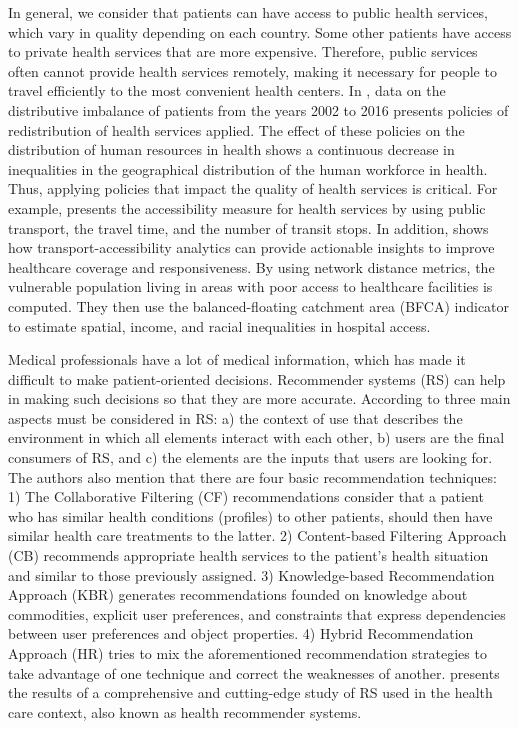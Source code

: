 \documentclass[sustainability,article,submit,pdftex,moreauthors]{Definitions/mdpi}
\begin{document}
In general, we consider that patients can have access to public health services, which vary in quality depending on each country. Some other patients have access to private health services that are more expensive. Therefore, public services often cannot provide health services remotely, making it necessary for people to travel efficiently to the most convenient health centers. In \citet{mollahaliloglu2021change}, data on the distributive imbalance of patients from the years 2002 to 2016 presents policies of redistribution of health services applied. The effect of these policies on the distribution of human resources in health shows a continuous decrease in inequalities in the geographical distribution of the human workforce in health. Thus, applying policies that impact the quality of health services is critical. For example, \citet{sharma2021public} presents the accessibility measure for health services by using public transport, the travel time, and the number of transit stops. In addition, \citet{PEREIRA2021113773} shows how transport-accessibility analytics can provide actionable insights to improve healthcare coverage and responsiveness. By using network distance metrics, the vulnerable population living in areas with poor access to healthcare facilities is computed. They then use the balanced-floating catchment area (BFCA) indicator to estimate spatial, income, and racial inequalities in hospital access.

Medical professionals have a lot of medical information, which has made it difficult to make patient-oriented decisions. Recommender systems (RS) can help in making such decisions so that they are more accurate. According to \citet{tran2021recommender} three main aspects must be considered in RS: a) the context of use that describes the environment in which all elements interact with each other, b) users are the final consumers of RS, and c) the elements are the inputs that users are looking for. The authors also mention that there are four basic recommendation techniques: 1) The Collaborative Filtering (CF) recommendations consider that a patient who has similar health conditions (profiles) to other patients, should then have similar health care treatments to the latter. 2) Content-based Filtering Approach (CB) recommends appropriate health services to the patient's health situation and similar to those previously assigned. 3) Knowledge-based Recommendation Approach (KBR) generates recommendations founded on knowledge about commodities, explicit user preferences, and constraints that express dependencies between user preferences and object properties. 4) Hybrid Recommendation Approach (HR) tries to mix the aforementioned recommendation strategies to take advantage of one technique and correct the weaknesses of another. \citet{pincay2019health} presents the results of a comprehensive and cutting-edge study of RS used in the health care context, also known as health recommender systems.
\end{document}
